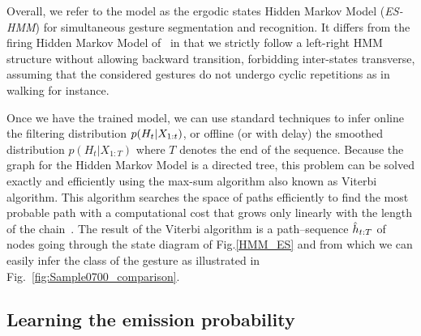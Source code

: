 Overall, we refer to the model as the ergodic states Hidden Markov Model (\emph{ES-HMM}) for simultaneous gesture segmentation and recognition. It  differs from the firing Hidden Markov Model of~\cite{nowozin2012action} in that we strictly follow a left-right HMM structure without allowing backward transition, forbidding inter-states transverse, assuming that the considered gestures do not undergo cyclic repetitions as in walking for instance.




Once we have the trained model, we can use standard techniques to infer online the filtering
distribution $p(H_t | X_{1:t})$,  or offline (or with delay)
the smoothed distribution $p(H_t | X_{1:T})$ where $T$ denotes the end of the sequence.
Because the graph for the Hidden Markov Model is a directed tree, this problem can be solved exactly and efficiently using the max-sum algorithm also known as Viterbi algorithm. This algorithm searches the space of paths efficiently to find the most probable path with a computational cost that grows only linearly with the length of the chain~\cite{bishop2006pattern}.
The result of the Viterbi algorithm is a path--sequence $\hat{h}_{t:T}$ of nodes going through the state diagram of
Fig.\ref{HMM_ES} and from which we can easily infer the class of the gesture as illustrated in Fig.~\ref{fig:Sample0700_comparison}.



\subsection{Learning the emission probability}
\label{sec:ProblemFormation}
\label{sec:emissionprob}

